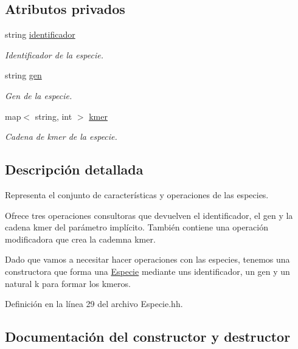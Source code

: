 \subsection*{Atributos privados}
\begin{DoxyCompactItemize}
\item 
string \hyperlink{class_especie_a9efba6a1733042dab5c3cb63533e0628}{identificador}
\begin{DoxyCompactList}\small\item\em Identificador de la especie. \end{DoxyCompactList}\item 
string \hyperlink{class_especie_ac35bb565f7346cd6317b3a8c849456d1}{gen}
\begin{DoxyCompactList}\small\item\em Gen de la especie. \end{DoxyCompactList}\item 
map$<$ string, int $>$ \hyperlink{class_especie_ab6740db160f2d7335a98fa8d9f745cbe}{kmer}
\begin{DoxyCompactList}\small\item\em Cadena de kmer de la especie. \end{DoxyCompactList}\end{DoxyCompactItemize}


\subsection{Descripción detallada}
Representa el conjunto de características y operaciones de las especies. 

Ofrece tres operaciones consultoras que devuelven el identificador, el gen y la cadena kmer del parámetro implícito. También contiene una operación modificadora que crea la cademna kmer.

Dado que vamos a necesitar hacer operaciones con las especies, tenemos una constructora que forma una \hyperlink{class_especie}{Especie} mediante uns identificador, un gen y un natural k para formar los kmeros. 

Definición en la línea 29 del archivo Especie.\+hh.



\subsection{Documentación del constructor y destructor}
\mbox{\label{class_especie_aa7219bcb41854d0f02b486fbfc0ce9a2}} 
